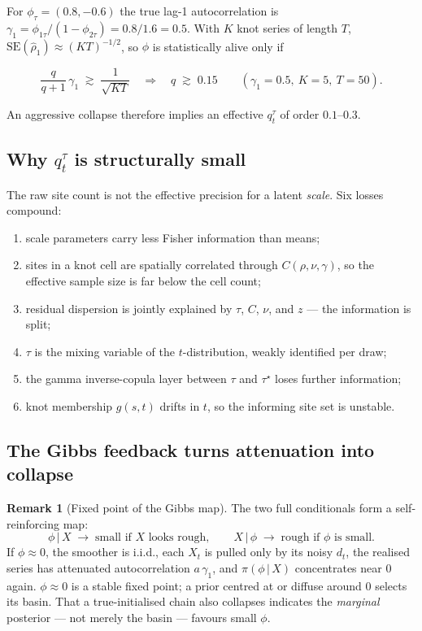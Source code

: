 \documentclass[11pt]{article}
\theoremstyle{definition}
\newtheorem{remark}{Remark}
\newcommand{\given}{\,\vert\,}
\begin{document}
For $\phi_\tau = (0.8, -0.6)$ the true lag-1 autocorrelation is
$\gamma_1 = \phi_{1\tau}/(1 - \phi_{2\tau}) = 0.8/1.6 = 0.5$. With $K$
knot series of length $T$, $\mathrm{SE}(\hat\rho_1) \approx (KT)^{-1/2}$,
so $\phi$ is statistically alive only if

\begin{equation}
  \frac{q}{q+1}\,\gamma_1 \;\gtrsim\; \frac{1}{\sqrt{KT}}
  \quad\Longrightarrow\quad
  q \;\gtrsim\; 0.15
  \qquad (\gamma_1 = 0.5,\ K = 5,\ T = 50).
  \label{eq:collapse-threshold}
\end{equation}

An aggressive collapse therefore implies an effective $q_t^\tau$ of
order $0.1$--$0.3$.

\subsection{Why $q_t^\tau$ is structurally small}

The raw site count is not the effective precision for a latent
\emph{scale}. Six losses compound:
\begin{enumerate}[leftmargin=2em, itemsep=0pt]
  \item scale parameters carry less Fisher information than means;
  \item sites in a knot cell are spatially correlated through
        $C(\rho, \nu, \gamma)$, so the effective sample size is far
        below the cell count;
  \item residual dispersion is jointly explained by $\tau$, $C$,
        $\nu$, and $z$ --- the information is split;
  \item $\tau$ is the mixing variable of the $t$-distribution, weakly
        identified per draw;
  \item the gamma inverse-copula layer between $\tau$ and $\tau^\star$
        loses further information;
  \item knot membership $g(s,t)$ drifts in $t$, so the informing site
        set is unstable.
\end{enumerate}

\subsection{The Gibbs feedback turns attenuation into collapse}

\begin{remark}[Fixed point of the Gibbs map]
\label{rem:gibbs-fixed-point}
The two full conditionals form a self-reinforcing map:
\[
  \phi \given X \;\longrightarrow\; \text{small if } X \text{ looks
  rough}, \qquad
  X \given \phi \;\longrightarrow\; \text{rough if } \phi \text{ is
  small}.
\]
If $\phi \approx 0$, the smoother is i.i.d., each $X_t$ is pulled only
by its noisy $d_t$, the realised series has attenuated autocorrelation
$a\,\gamma_1$, and $\pi(\phi \given X)$ concentrates near $0$ again.
$\phi \approx 0$ is a stable fixed point; a prior centred at or diffuse
around $0$ selects its basin. That a true-initialised chain also
collapses indicates the \emph{marginal} posterior --- not merely the
basin --- favours small $\phi$.
\end{remark}
\end{document}
